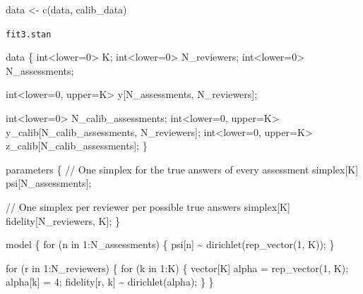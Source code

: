 \documentclass[
  letterpaper,
  DIV=11,
  numbers=noendperiod]{scrartcl}
\newenvironment{Shaded}{\begin{snugshade}}{\end{snugshade}}
\newcommand{\CommentTok}[1]{\textcolor[rgb]{0.37,0.37,0.37}{#1}}
\newcommand{\ControlFlowTok}[1]{\textcolor[rgb]{0.00,0.23,0.31}{#1}}
\newcommand{\DataTypeTok}[1]{\textcolor[rgb]{0.68,0.00,0.00}{#1}}
\newcommand{\DecValTok}[1]{\textcolor[rgb]{0.68,0.00,0.00}{#1}}
\newcommand{\FunctionTok}[1]{\textcolor[rgb]{0.28,0.35,0.67}{#1}}
\newcommand{\KeywordTok}[1]{\textcolor[rgb]{0.00,0.23,0.31}{#1}}
\newcommand{\NormalTok}[1]{\textcolor[rgb]{0.00,0.23,0.31}{#1}}
\newcommand{\OtherTok}[1]{\textcolor[rgb]{0.00,0.23,0.31}{#1}}
\begin{document}
\begin{Shaded}
\begin{Highlighting}[]
\NormalTok{data }\OtherTok{\textless{}{-}} \FunctionTok{c}\NormalTok{(data, calib\_data)}
\end{Highlighting}
\end{Shaded}

\begin{codelisting}

\caption{\texttt{fit3.stan}}

\begin{Shaded}
\begin{Highlighting}[]
\KeywordTok{data}\NormalTok{ \{}
  \DataTypeTok{int}\NormalTok{\textless{}}\KeywordTok{lower}\NormalTok{=}\DecValTok{0}\NormalTok{\textgreater{} K;}
  \DataTypeTok{int}\NormalTok{\textless{}}\KeywordTok{lower}\NormalTok{=}\DecValTok{0}\NormalTok{\textgreater{} N\_reviewers;}
  \DataTypeTok{int}\NormalTok{\textless{}}\KeywordTok{lower}\NormalTok{=}\DecValTok{0}\NormalTok{\textgreater{} N\_assessments;}

  \DataTypeTok{int}\NormalTok{\textless{}}\KeywordTok{lower}\NormalTok{=}\DecValTok{0}\NormalTok{, }\KeywordTok{upper}\NormalTok{=K\textgreater{} y[N\_assessments, N\_reviewers];}
  
  \DataTypeTok{int}\NormalTok{\textless{}}\KeywordTok{lower}\NormalTok{=}\DecValTok{0}\NormalTok{\textgreater{} N\_calib\_assessments;}
  \DataTypeTok{int}\NormalTok{\textless{}}\KeywordTok{lower}\NormalTok{=}\DecValTok{0}\NormalTok{, }\KeywordTok{upper}\NormalTok{=K\textgreater{} y\_calib[N\_calib\_assessments, N\_reviewers];}
  \DataTypeTok{int}\NormalTok{\textless{}}\KeywordTok{lower}\NormalTok{=}\DecValTok{0}\NormalTok{, }\KeywordTok{upper}\NormalTok{=K\textgreater{} z\_calib[N\_calib\_assessments];}
\NormalTok{\}}

\KeywordTok{parameters}\NormalTok{ \{}
  \CommentTok{// One simplex for the true answers of every assessment}
  \DataTypeTok{simplex}\NormalTok{[K] psi[N\_assessments];}
  
  \CommentTok{// One simplex per reviewer per possible true answers}
  \DataTypeTok{simplex}\NormalTok{[K] fidelity[N\_reviewers, K];}
\NormalTok{\}}

\KeywordTok{model}\NormalTok{ \{}
  \ControlFlowTok{for}\NormalTok{ (n }\ControlFlowTok{in} \DecValTok{1}\NormalTok{:N\_assessments) \{}
\NormalTok{    psi[n] \textasciitilde{} dirichlet(rep\_vector(}\DecValTok{1}\NormalTok{, K));}
\NormalTok{  \}}
  
  \ControlFlowTok{for}\NormalTok{ (r }\ControlFlowTok{in} \DecValTok{1}\NormalTok{:N\_reviewers) \{}
    \ControlFlowTok{for}\NormalTok{ (k }\ControlFlowTok{in} \DecValTok{1}\NormalTok{:K) \{}
      \DataTypeTok{vector}\NormalTok{[K] alpha = rep\_vector(}\DecValTok{1}\NormalTok{, K);}
\NormalTok{      alpha[k] = }\DecValTok{4}\NormalTok{;}
\NormalTok{      fidelity[r, k] \textasciitilde{} dirichlet(alpha);}
\NormalTok{    \}}
\NormalTok{  \}}
  

\end{Highlighting}
\end{Shaded}
\end{codelisting}
\end{document}
